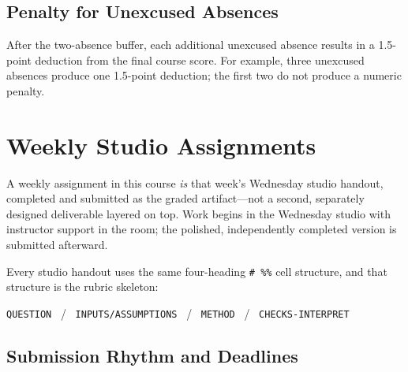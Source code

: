 \documentclass[11pt]{article}
\begin{document}
\subsection{Penalty for Unexcused Absences}

After the two-absence buffer, each additional unexcused absence results in a 1.5-point
deduction from the final course score. For example, three unexcused absences produce one
1.5-point deduction; the first two do not produce a numeric penalty.

\section{Weekly Studio Assignments}

A weekly assignment in this course \emph{is} that week's Wednesday studio handout, completed
and submitted as the graded artifact---not a second, separately designed deliverable layered
on top. Work begins in the Wednesday studio with instructor support in the room; the polished,
independently completed version is submitted afterward.

Every studio handout uses the same four-heading \texttt{\# \%\%} cell structure, and that
structure is the rubric skeleton:

\begin{center}
\texttt{QUESTION} \, / \, \texttt{INPUTS/ASSUMPTIONS} \, / \, \texttt{METHOD} \, / \,
\texttt{CHECKS-INTERPRET}
\end{center}

\subsection{Submission Rhythm and Deadlines}
\end{document}
